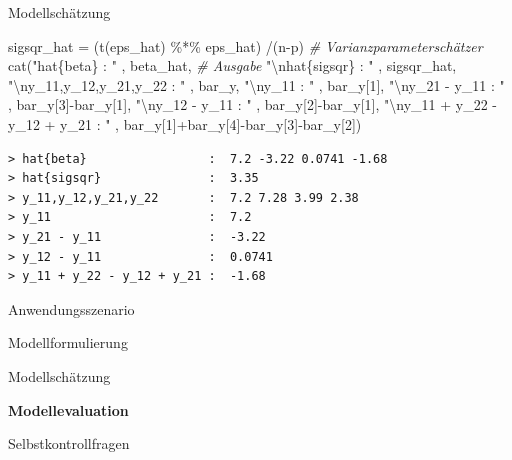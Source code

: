 \documentclass[
  8pt,
  ignorenonframetext,
]{beamer}
\newenvironment{Shaded}{\begin{snugshade}}{\end{snugshade}}
\newcommand{\CommentTok}[1]{\textcolor[rgb]{0.56,0.35,0.01}{\textit{#1}}}
\newcommand{\DecValTok}[1]{\textcolor[rgb]{0.00,0.00,0.81}{#1}}
\newcommand{\FunctionTok}[1]{\textcolor[rgb]{0.00,0.00,0.00}{#1}}
\newcommand{\NormalTok}[1]{#1}
\newcommand{\OtherTok}[1]{\textcolor[rgb]{0.56,0.35,0.01}{#1}}
\newcommand{\SpecialCharTok}[1]{\textcolor[rgb]{0.00,0.00,0.00}{#1}}
\newcommand{\StringTok}[1]{\textcolor[rgb]{0.31,0.60,0.02}{#1}}
\begin{document}
\begin{frame}[fragile]{Modellschätzung}
\begin{Shaded}
\begin{Highlighting}[]
\NormalTok{sigsqr\_hat }\OtherTok{=}\NormalTok{ (}\FunctionTok{t}\NormalTok{(eps\_hat) }\SpecialCharTok{\%*\%}\NormalTok{ eps\_hat) }\SpecialCharTok{/}\NormalTok{(n}\SpecialCharTok{{-}}\NormalTok{p)                 }\CommentTok{\# Varianzparameterschätzer}
\FunctionTok{cat}\NormalTok{(}\StringTok{"hat\{beta\}                 : "}\NormalTok{   , beta\_hat,             }\CommentTok{\# Ausgabe}
    \StringTok{"}\SpecialCharTok{\textbackslash{}n}\StringTok{hat\{sigsqr\}               : "}\NormalTok{ , sigsqr\_hat,}
    \StringTok{"}\SpecialCharTok{\textbackslash{}n}\StringTok{y\_11,y\_12,y\_21,y\_22       : "}\NormalTok{ , bar\_y,}
    \StringTok{"}\SpecialCharTok{\textbackslash{}n}\StringTok{y\_11                      : "}\NormalTok{ , bar\_y[}\DecValTok{1}\NormalTok{],}
    \StringTok{"}\SpecialCharTok{\textbackslash{}n}\StringTok{y\_21 {-} y\_11               : "}\NormalTok{ , bar\_y[}\DecValTok{3}\NormalTok{]}\SpecialCharTok{{-}}\NormalTok{bar\_y[}\DecValTok{1}\NormalTok{],}
    \StringTok{"}\SpecialCharTok{\textbackslash{}n}\StringTok{y\_12 {-} y\_11               : "}\NormalTok{ , bar\_y[}\DecValTok{2}\NormalTok{]}\SpecialCharTok{{-}}\NormalTok{bar\_y[}\DecValTok{1}\NormalTok{],}
    \StringTok{"}\SpecialCharTok{\textbackslash{}n}\StringTok{y\_11 + y\_22 {-} y\_12 + y\_21 : "}\NormalTok{ , bar\_y[}\DecValTok{1}\NormalTok{]}\SpecialCharTok{+}\NormalTok{bar\_y[}\DecValTok{4}\NormalTok{]}\SpecialCharTok{{-}}\NormalTok{bar\_y[}\DecValTok{3}\NormalTok{]}\SpecialCharTok{{-}}\NormalTok{bar\_y[}\DecValTok{2}\NormalTok{])}
\end{Highlighting}
\end{Shaded}

\begin{verbatim}
> hat{beta}                 :  7.2 -3.22 0.0741 -1.68 
> hat{sigsqr}               :  3.35 
> y_11,y_12,y_21,y_22       :  7.2 7.28 3.99 2.38 
> y_11                      :  7.2 
> y_21 - y_11               :  -3.22 
> y_12 - y_11               :  0.0741 
> y_11 + y_22 - y_12 + y_21 :  -1.68
\end{verbatim}
\end{frame}

\begin{frame}{}
\protect\hypertarget{section-7}{}
\large
{}
\vfill

Anwendungsszenario

Modellformulierung

Modellschätzung

\textbf{Modellevaluation}

Selbstkontrollfragen \vfill
\end{frame}
\end{document}
